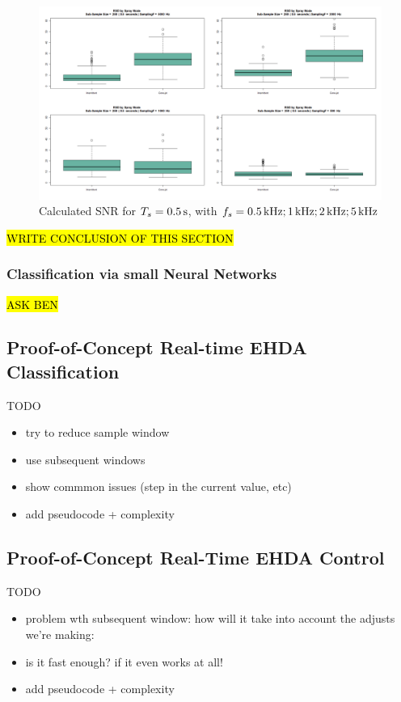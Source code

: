 \documentclass[oneside,12pt]{article}
\begin{document}
\begin{figure}[h!]
    \centering
    \includegraphics[width=\textwidth,trim=1 1 1 1,clip]{figures/snr-subsample.png}
    \caption{Calculated SNR for $T_s = 0.5 \,\mathrm{s}$, with $f_s = 0.5 \,\mathrm{kHz}; 1 \,\mathrm{kHz}; 2 \,\mathrm{kHz}; 5 \,\mathrm{kHz}$}
    \label{fig:snr-subsample}
\end{figure}

\hl{WRITE CONCLUSION OF THIS SECTION}

\subsubsection{Classification via small Neural Networks}

\hl{ASK BEN}

\subsection{Proof-of-Concept Real-time EHDA Classification}\label{sec:classification-algorithm}

TODO
\begin{itemize}
    \item try to reduce sample window
    \item use subsequent windows
    \item show commmon issues (step in the current value, etc)
    \item add pseudocode + complexity
\end{itemize}

\subsection{Proof-of-Concept Real-Time EHDA Control}
TODO

\begin{itemize}
    \item problem wth subsequent window: how will it take into account the adjusts we're making:
    \item is it fast enough? if it even works at all!
    \item add pseudocode + complexity
\end{itemize}

\newpage    \pagestyle{plain}

\end{document}
